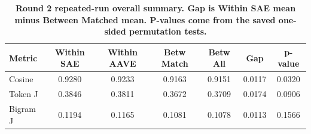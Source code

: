 \begin{table}[htbp]
\centering
\caption{\textbf{Round 2 repeated-run overall summary. Gap is Within SAE mean minus Between Matched mean. P-values come from the saved one-sided permutation tests.}}
\label{tab:round2-repeated-summary}
\renewcommand{\arraystretch}{1.4}
\begin{tabular}{|l|c|c|c|c|c|c|}
\hline
\textbf{Metric} & \textbf{Within SAE} & \textbf{Within AAVE} & \textbf{Betw Match} & \textbf{Betw All} & \textbf{Gap} & \textbf{p-value} \\
\hline
Cosine & 0.9280 & 0.9233 & 0.9163 & 0.9151 & 0.0117 & 0.0320 \\
\hline
Token J & 0.3846 & 0.3811 & 0.3672 & 0.3709 & 0.0174 & 0.0906 \\
\hline
Bigram J & 0.1194 & 0.1165 & 0.1081 & 0.1078 & 0.0113 & 0.1566 \\
\hline
\end{tabular}
\end{table}
